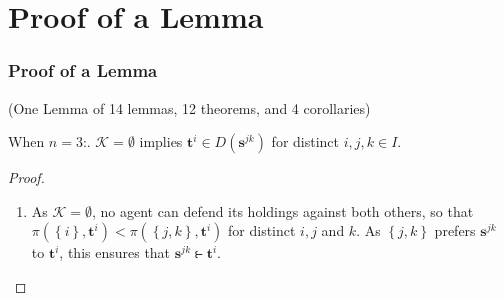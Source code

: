 \documentclass{beamer}
\makeatletter
\def\mcolor#1#2{\rule{0ex}{0ex}\color{#1}#2\color{black}{}}
\def\Quant#1#2{\begin{array}[t]{@{}c@{}}#1 \\[-1ex] \scriptstyle #2 \end{array}\;}
\def\ForAll#1{\Quant{\forall}{#1}}
\newenvironment{flist}{\begin{array}{@{}ll@{}}}{\end{array}}
\newenvironment{Envanywithlong}[4]{\vspace{0.3ex}\par\noindent \textbf{#1}[``#2'', any[$#3$], \\
  \makebox[3mm]{}with[$#4$], \\[0.5ex]\makebox[5mm]{}
  \begin{math}\begin{flist}}{\end{flist}]%
  \end{math}\vspace{0.3ex}\rmfamily}
\makeatother
\begin{document}
\section{Proof of a Lemma}
\begin{frame}
\frametitle{Proof of a Lemma}
(One Lemma of 14 lemmas, 12 theorems, and 4 corollaries)
 



\begin{lemma}
  When $n = 3$:. $\mathcal{K} = \emptyset$ implies $\bm{t}^i \in D \left( \bm{s}^{jk} \right)$\quad
  for distinct $i, j, k \in I$.
\end{lemma}
\begin{proof}
  \begin{enumerate}
  \item As $\mathcal{K} = \emptyset$, no agent can defend its holdings
    against both others, so that $\pi \left( \left\{ i \right\},
      \bm{t}^i \right) < \pi \left( \left\{ j, k \right\}, \bm{t}^i
    \right)$ for distinct $i, j$ and $k$.  As $\left\{ j, k \right\}$
    prefers $\bm{s}^{jk}$ to $\bm{t}^i$, this ensures that
    $\bm{s}^{jk} \strictfi \bm{t}^i$.
  \end{enumerate}
\end{proof}
\end{frame}


\end{document}
